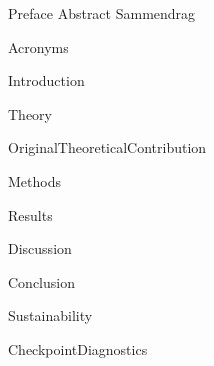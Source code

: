 \documentclass{article}
\begin{document}
\frontmatter

{Preface}
{Abstract}
{Sammendrag}

\tableofcontents

\listoffigures
\listoftables
{Acronyms}

\mainmatter

{Introduction}

{Theory}

{OriginalTheoreticalContribution}

{Methods}

{Results}

{Discussion}

{Conclusion}

{Sustainability}

\newpage
\printbibliography[heading = bibintoc, title = Bibliography]    %

\addappendix
{CheckpointDiagnostics}
\end{document}
